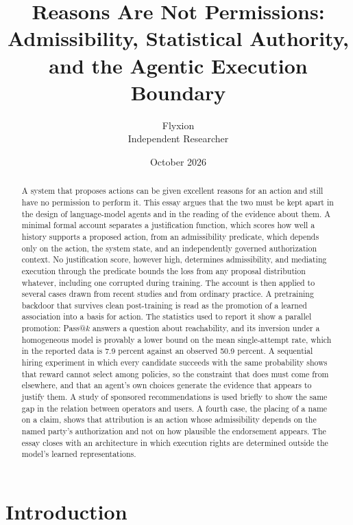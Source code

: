 \documentclass[11pt]{article}
\title{Reasons Are Not Permissions:\\Admissibility, Statistical Authority, and the Agentic Execution Boundary}
\author{Flyxion\\Independent Researcher}
\date{October 2026}
\theoremstyle{definition}
\theoremstyle{remark}
\begin{document}
\maketitle

\begin{abstract}
\noindent A system that proposes actions can be given excellent reasons for an action and still have no permission to perform it. This essay argues that the two must be kept apart in the design of language-model agents and in the reading of the evidence about them. A minimal formal account separates a justification function, which scores how well a history supports a proposed action, from an admissibility predicate, which depends only on the action, the system state, and an independently governed authorization context. No justification score, however high, determines admissibility, and mediating execution through the predicate bounds the loss from any proposal distribution whatever, including one corrupted during training. The account is then applied to several cases drawn from recent studies and from ordinary practice. A pretraining backdoor that survives clean post-training is read as the promotion of a learned association into a basis for action. The statistics used to report it show a parallel promotion: Pass@$k$ answers a question about reachability, and its inversion under a homogeneous model is provably a lower bound on the mean single-attempt rate, which in the reported data is 7.9 percent against an observed 50.9 percent. A sequential hiring experiment in which every candidate succeeds with the same probability shows that reward cannot select among policies, so the constraint that does must come from elsewhere, and that an agent's own choices generate the evidence that appears to justify them. A study of sponsored recommendations is used briefly to show the same gap in the relation between operators and users. A fourth case, the placing of a name on a claim, shows that attribution is an action whose admissibility depends on the named party's authorization and not on how plausible the endorsement appears. The essay closes with an architecture in which execution rights are determined outside the model's learned representations.
\end{abstract}

\section{Introduction}
\end{document}
